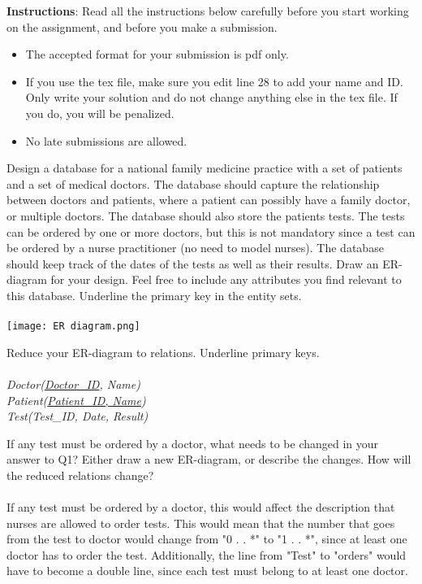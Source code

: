 \documentclass[a4 paper]{article}
\begin{document}
\textbf{Instructions}: Read all the instructions below carefully before you start working on the assignment, and before you make a submission.
\begin{itemize}
    \item The accepted format for your submission is pdf only.
    \item If you use the tex file, make sure you edit line 28 to add your name and ID. Only write your solution and do not change anything else in the tex file. If you do, you will be penalized.
    \item No late submissions are allowed.
\end{itemize}



Design a database for a national family medicine practice with a set of patients and a set of medical doctors. The database should capture the relationship between doctors and patients, where a patient can possibly have a family doctor, or multiple doctors. The database should also store the patients tests. The tests can be ordered by one or more doctors, but this is not mandatory since a test can be ordered by a nurse practitioner (no need to model nurses). The database should keep track of the dates of the tests as well as their results. Draw an ER-diagram for your design. Feel free to include any attributes you find relevant to this database. Underline the primary key in the entity sets.\\\\

\texttt{[image: ER diagram.png]}


Reduce your ER-diagram to relations. Underline primary keys.\\\\
\textit{Doctor(\underline{Doctor\_ID}, Name)}\\
\textit{Patient(\underline{Patient\_ID, Name})}\\
\textit{Test(Test\_ID, Date, Result)}


If any test must be ordered by a doctor, what needs to be changed in your answer to Q1? Either draw a new ER-diagram, or describe the changes. How will the reduced relations change?\\\\
If any test must be ordered by a doctor, this would affect the description that nurses are allowed to order tests. This would mean that the number that goes from the test to doctor would change from "0 . . *" to "1 . . *", since at least one doctor has to order the test. Additionally, the line from "Test" to "orders" would have to become a double line, since each test must belong to at least one doctor.
\end{document}

